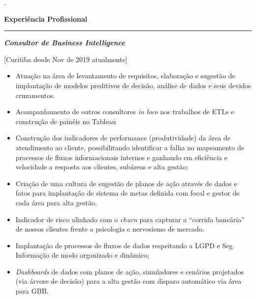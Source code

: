 \documentclass{article}
\begin{document}
\newpage

.
\begin{center}
\textbf{Experiência Profissional}
\end{center}

\rule[6cm]{6in}{0.1pt} 
\vspace{-5cm}
\begin{flushleft}


\vspace{.25cm}
\textbf{\textit{Consultor de Business Intelligence}}

[Curitiba desde Nov de 2019 atualmente]
\end{flushleft}

\begin{itemize}
\item Atuação na área de levantamento de requisitos, elaboração e sugestão de implantação de modelos preditivos de decisão, análise de dados e seus devidos cruzamentos.
\item Acompanhamento de outros consultores \textit{in loco} nos trabalhos de ETLs e construção de painéis no Tableau
\end{itemize}
\begin{flushleft}
}

\vspace{.25cm}
\textbf{\textit{Analista de Estatísticas Sr.}}

[Curitiba de Mai 2019 até Out 2019]
\end{flushleft}

\begin{itemize}
\item Construção dos indicadores de performance (produtividade) da área de atendimento ao cliente, possibilitando identificar a falha no mapeamento de processos de fluxos informacionais internos e ganhando em eficiência e velocidade a resposta aos clientes, subáreas e alta gestão;  
\item Criação de uma cultura de sugestão de planos de ação através de dados e fatos para implantação de sistema de metas definida com focal e gestor de cada área para alta gestão.
\item Indicador de risco alinhado com o \textit{churn} para capturar a “corrida bancária” de nossos clientes frente a psicologia e nervosismo de mercado. 
\item Implantação de processos de fluxos de dados respeitando a LGPD e Seg. Informação de modo organizado e dinâmico;
\item \textit{Dashboards} de dados com planos de ação, simuladores e cenários projetados (via árvore de decisão) para a alta gestão com disparo automático via área para GBB.
\end{itemize}
\end{document}
